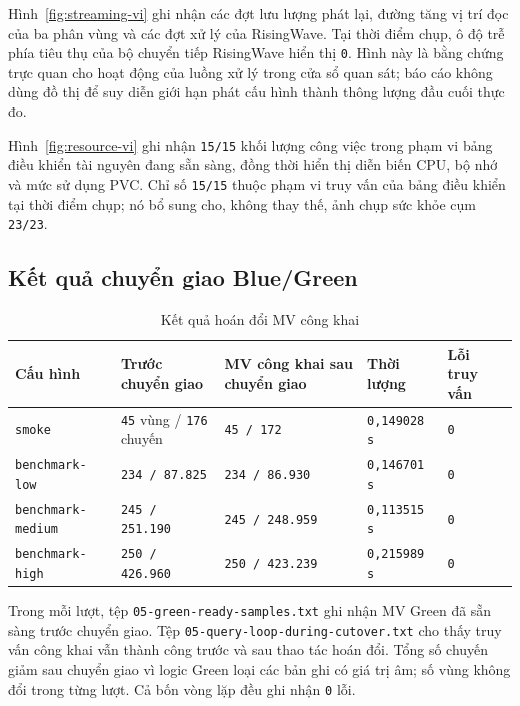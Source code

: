Hình~\ref{fig:streaming-vi} ghi nhận các đợt lưu lượng phát lại, đường tăng vị trí đọc của ba phân vùng và các đợt xử lý của RisingWave. Tại thời điểm chụp, ô độ trễ phía tiêu thụ của bộ chuyển tiếp RisingWave hiển thị \texttt{0}. Hình này là bằng chứng trực quan cho hoạt động của luồng xử lý trong cửa sổ quan sát; báo cáo không dùng đồ thị để suy diễn giới hạn phát cấu hình thành thông lượng đầu cuối thực đo.

Hình~\ref{fig:resource-vi} ghi nhận \texttt{15/15} khối lượng công việc trong phạm vi bảng điều khiển tài nguyên đang sẵn sàng, đồng thời hiển thị diễn biến CPU, bộ nhớ và mức sử dụng PVC. Chỉ số \texttt{15/15} thuộc phạm vi truy vấn của bảng điều khiển tại thời điểm chụp; nó bổ sung cho, không thay thế, ảnh chụp sức khỏe cụm \texttt{23/23}.

\clearpage
\subsection{Kết quả chuyển giao Blue/Green}
\begin{table}[H]
\centering
\caption{Kết quả hoán đổi MV công khai}
\label{tab:cutover-results-vi}
\begin{tabularx}{\textwidth}{@{}p{}p{}p{}p{}Y@{}}
\toprule
\textbf{Cấu hình} & \textbf{Trước chuyển giao} & \textbf{MV công khai sau chuyển giao} & \textbf{Thời lượng} & \textbf{Lỗi truy vấn}\\
\midrule
\texttt{smoke} & \texttt{45} vùng / \texttt{176} chuyến & \texttt{45 / 172} & \texttt{0,149028 s} & \texttt{0}\\
\texttt{benchmark-low} & \texttt{234 / 87.825} & \texttt{234 / 86.930} & \texttt{0,146701 s} & \texttt{0}\\
\texttt{benchmark-medium} & \texttt{245 / 251.190} & \texttt{245 / 248.959} & \texttt{0,113515 s} & \texttt{0}\\
\texttt{benchmark-high} & \texttt{250 / 426.960} & \texttt{250 / 423.239} & \texttt{0,215989 s} & \texttt{0}\\
\bottomrule
\end{tabularx}
\end{table}

Trong mỗi lượt, tệp \texttt{05-green-ready-samples.txt} ghi nhận MV Green đã sẵn sàng trước chuyển giao. Tệp \texttt{05-query-loop-during-cutover.txt} cho thấy truy vấn công khai vẫn thành công trước và sau thao tác hoán đổi. Tổng số chuyến giảm sau chuyển giao vì logic Green loại các bản ghi có giá trị âm; số vùng không đổi trong từng lượt. Cả bốn vòng lặp đều ghi nhận \texttt{0} lỗi.

